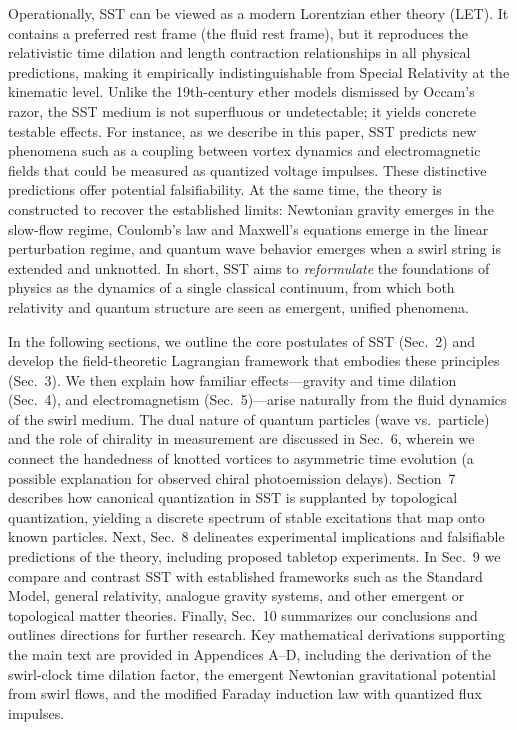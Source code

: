 \documentclass[10pt,reprint,aps,onecolumn,nofootinbib]{revtex4-2}
\begin{document}
Operationally, SST can be viewed as a modern Lorentzian ether theory (LET). It contains a preferred rest frame (the fluid rest frame), but it reproduces the relativistic time dilation and length contraction relationships in all physical predictions, making it empirically indistinguishable from Special Relativity at the kinematic level. Unlike the 19th-century ether models dismissed by Occam’s razor, the SST medium is not superfluous or undetectable; it yields concrete testable effects. For instance, as we describe in this paper, SST predicts new phenomena such as a coupling between vortex dynamics and electromagnetic fields that could be measured as quantized voltage impulses. These distinctive predictions offer potential falsifiability. At the same time, the theory is constructed to recover the established limits: Newtonian gravity emerges in the slow-flow regime, Coulomb’s law and Maxwell’s equations emerge in the linear perturbation regime, and quantum wave behavior emerges when a swirl string is extended and unknotted. In short, SST aims to \emph{reformulate} the foundations of physics as the dynamics of a single classical continuum, from which both relativity and quantum structure are seen as emergent, unified phenomena.


In the following sections, we outline the core postulates of SST (Sec.~2) and develop the field-theoretic Lagrangian framework that embodies these principles (Sec.~3). We then explain how familiar effects---gravity and time dilation (Sec.~4), and electromagnetism (Sec.~5)---arise naturally from the fluid dynamics of the swirl medium. The dual nature of quantum particles (wave vs.~particle) and the role of chirality in measurement are discussed in Sec.~6, wherein we connect the handedness of knotted vortices to asymmetric time evolution (a possible explanation for observed chiral photoemission delays). Section~7 describes how canonical quantization in SST is supplanted by topological quantization, yielding a discrete spectrum of stable excitations that map onto known particles. Next, Sec.~8 delineates experimental implications and falsifiable predictions of the theory, including proposed tabletop experiments. In Sec.~9 we compare and contrast SST with established frameworks such as the Standard Model, general relativity, analogue gravity systems, and other emergent or topological matter theories. Finally, Sec.~10 summarizes our conclusions and outlines directions for further research. Key mathematical derivations supporting the main text are provided in Appendices A–D, including the derivation of the swirl-clock time dilation factor, the emergent Newtonian gravitational potential from swirl flows, and the modified Faraday induction law with quantized flux impulses.
\end{document}
